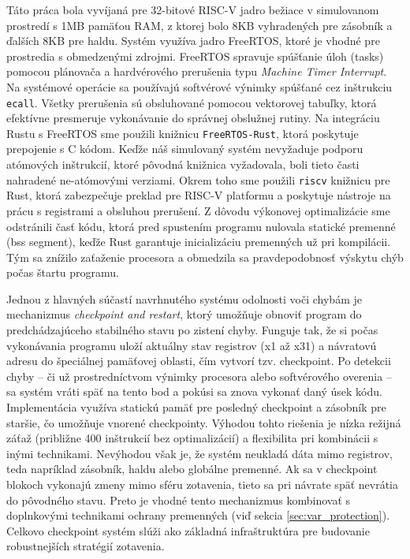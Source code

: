 \documentclass[12pt, letterpaper]{article}
\begin{document}
Táto práca bola vyvíjaná pre 32-bitové RISC-V jadro bežiace v simulovanom prostredí s 1MB pamäťou RAM, z ktorej bolo 8KB vyhradených pre zásobník a ďalších 8KB pre haldu. Systém využíva jadro FreeRTOS, ktoré je vhodné pre prostredia s obmedzenými zdrojmi. FreeRTOS spravuje spúšťanie úloh (tasks) pomocou plánovača a hardvérového prerušenia typu \textit{Machine Timer Interrupt}. Na systémové operácie sa používajú softvérové výnimky spúšťané cez inštrukciu \texttt{ecall}. Všetky prerušenia sú obsluhované pomocou vektorovej tabuľky, ktorá efektívne presmeruje vykonávanie do správnej obslužnej rutiny. Na integráciu Rustu s FreeRTOS sme použili knižnicu \texttt{FreeRTOS-Rust}, ktorá poskytuje prepojenie s C kódom. Keďže náš simulovaný systém nevyžaduje podporu atómových inštrukcií, ktoré pôvodná knižnica vyžadovala, boli tieto časti nahradené ne-atómovými verziami. Okrem toho sme použili \texttt{riscv} knižnicu pre Rust, ktorá zabezpečuje preklad pre RISC-V platformu a poskytuje nástroje na prácu s registrami a obsluhou prerušení. Z dôvodu výkonovej optimalizácie sme odstránili časť kódu, ktorá pred spustením programu nulovala statické premenné (\acrshort{bss} segment), keďže Rust garantuje inicializáciu premenných už pri kompilácii. Tým sa znížilo zaťaženie procesora a obmedzila sa pravdepodobnosť výskytu chýb počas štartu programu.

Jednou z hlavných súčastí navrhnutého systému odolnosti voči chybám je mechanizmus \textit{checkpoint and restart}, ktorý umožňuje obnoviť program do predchádzajúceho stabilného stavu po zistení chyby. Funguje tak, že si počas vykonávania programu uloží aktuálny stav registrov (x1 až x31) a návratovú adresu do špeciálnej pamäťovej oblasti, čím vytvorí tzv. checkpoint. Po detekcii chyby – či už prostredníctvom výnimky procesora alebo softvérového overenia – sa systém vráti späť na tento bod a pokúsi sa znova vykonať daný úsek kódu. Implementácia využíva statickú pamäť pre posledný checkpoint a zásobník pre staršie, čo umožňuje vnorené checkpointy. Výhodou tohto riešenia je nízka režijná záťaž (približne 400 inštrukcií bez optimalizácií) a flexibilita pri kombinácii s inými technikami. Nevýhodou však je, že systém neukladá dáta mimo registrov, teda napríklad zásobník, haldu alebo globálne premenné. Ak sa v checkpoint blokoch vykonajú zmeny mimo sféru zotavenia, tieto sa pri návrate späť nevrátia do pôvodného stavu. Preto je vhodné tento mechanizmus kombinovať s doplnkovými technikami ochrany premenných (viď sekcia \ref{sec:var_protection}). Celkovo checkpoint systém slúži ako základná infraštruktúra pre budovanie robustnejších stratégií zotavenia.
\end{document}
